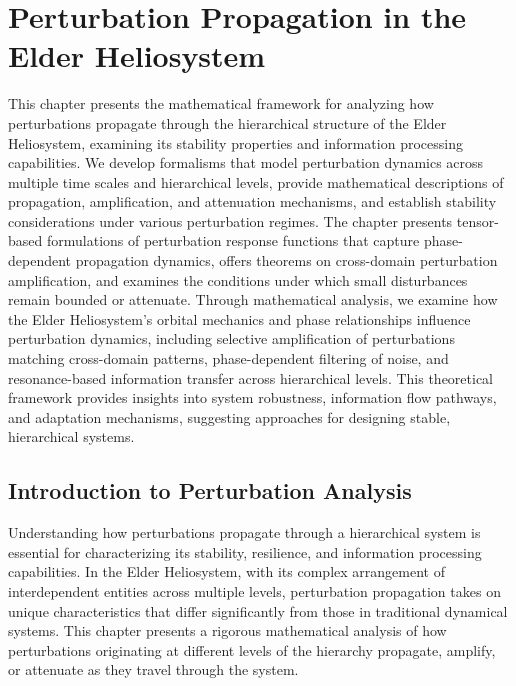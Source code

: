 \chapter{Perturbation Propagation in the Elder Heliosystem}

\begin{tcolorbox}[colback=DarkSkyBlue!5!white,colframe=DarkSkyBlue!75!black,title=Chapter Summary]
This chapter presents the mathematical framework for analyzing how perturbations propagate through the hierarchical structure of the Elder Heliosystem, examining its stability properties and information processing capabilities. We develop formalisms that model perturbation dynamics across multiple time scales and hierarchical levels, provide mathematical descriptions of propagation, amplification, and attenuation mechanisms, and establish stability considerations under various perturbation regimes. The chapter presents tensor-based formulations of perturbation response functions that capture phase-dependent propagation dynamics, offers theorems on cross-domain perturbation amplification, and examines the conditions under which small disturbances remain bounded or attenuate. Through mathematical analysis, we examine how the Elder Heliosystem's orbital mechanics and phase relationships influence perturbation dynamics, including selective amplification of perturbations matching cross-domain patterns, phase-dependent filtering of noise, and resonance-based information transfer across hierarchical levels. This theoretical framework provides insights into system robustness, information flow pathways, and adaptation mechanisms, suggesting approaches for designing stable, hierarchical systems.
\end{tcolorbox}

\section{Introduction to Perturbation Analysis}

Understanding how perturbations propagate through a hierarchical system is essential for characterizing its stability, resilience, and information processing capabilities. In the Elder Heliosystem, with its complex arrangement of interdependent entities across multiple levels, perturbation propagation takes on unique characteristics that differ significantly from those in traditional dynamical systems. This chapter presents a rigorous mathematical analysis of how perturbations originating at different levels of the hierarchy propagate, amplify, or attenuate as they travel through the system.

